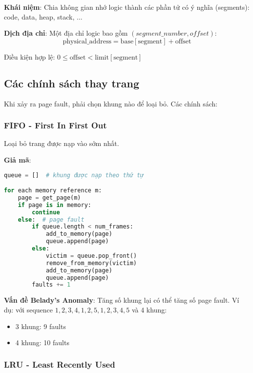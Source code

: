 \textbf{Khái niệm}: Chia không gian nhớ logic thành các phần tử có ý nghĩa 
(segments): code, data, heap, stack, ...

\textbf{Dịch địa chỉ}:
Một địa chỉ logic bao gồm $(segment\_number, offset)$:
\begin{equation}
\text{physical\_address} = \text{base}[\text{segment}] + \text{offset}
\end{equation}

Điều kiện hợp lệ: $0 \le \text{offset} < \text{limit}[\text{segment}]$

\subsection{Các chính sách thay trang}

Khi xảy ra page fault, phải chọn khung nào để loại bỏ. Các chính sách:

\subsubsection*{FIFO - First In First Out}

Loại bỏ trang được nạp vào sớm nhất.

\textbf{Giả mã}:
\begin{lstlisting}[language=Python,caption={FIFO replacement}]
queue = []  # khung được nạp theo thứ tự

for each memory reference m:
    page = get_page(m)
    if page is in memory:
        continue
    else:  # page fault
        if queue.length < num_frames:
            add_to_memory(page)
            queue.append(page)
        else:
            victim = queue.pop_front()
            remove_from_memory(victim)
            add_to_memory(page)
            queue.append(page)
        faults += 1
\end{lstlisting}

\textbf{Vấn đề Belady's Anomaly}: Tăng số khung lại có thể tăng số page fault. 
Ví dụ: với sequence $1,2,3,4,1,2,5,1,2,3,4,5$ và 4 khung:
\begin{itemize}[leftmargin=1.5cm]
  \item 3 khung: 9 faults
  \item 4 khung: 10 faults
\end{itemize}

\subsubsection*{LRU - Least Recently Used}

